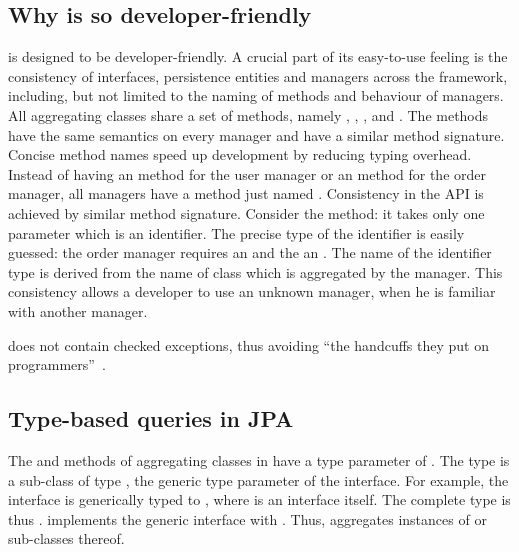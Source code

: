 \subsection{Why \salespoint{} is so developer-friendly}
\salespoint{} is designed to be developer-friendly.
A crucial part of its easy-to-use feeling is the consistency of interfaces, persistence entities and managers across the framework, including, but not limited to the naming of methods and behaviour of managers.
All aggregating classes share a set of methods, namely , , ,  and .
The methods have the same semantics on every manager and have a similar method signature.
Concise method names speed up development by reducing typing overhead.
Instead of having an  method for the user manager or an  method for the order manager, all managers have a method just named .
Consistency in the API is achieved by similar method signature.
Consider the  method: it takes only one parameter which is an identifier.
The precise type of the identifier is easily guessed: the order manager requires an  and the  an .
The name of the identifier type is derived from the name of class which is aggregated by the manager.
This consistency allows a developer to use an unknown manager, when he is familiar with another manager.

\salespoint{} does not contain checked exceptions, thus avoiding ``the handcuffs they put on programmers''~\cite{checked-exceptions}.

\subsection{Type-based queries in JPA}
\label{jpa-types}
The  and  methods of aggregating classes in \salespoint{} have a type parameter of .
The type  is a sub-class of type , the generic type parameter of the interface.
For example, the  interface is generically typed to , where  is an interface itself.
The complete type is thus .
 implements the generic  interface with .
Thus,  aggregates instances of  or sub-classes thereof.

